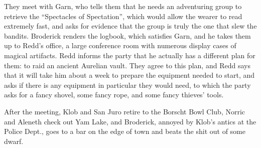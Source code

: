 They meet with Garn, who tells them that he needs an adventuring group to retrieve the ``Spectacles of Spectation'', which would allow the wearer to read extremely fast, and asks for evidence that the group is truly the one that slew the bandits. Broderick renders the logbook, which satisfies Garn, and he takes them up to Redd's office, a large conference room with numerous display cases of magical artifacts. Redd informs the party that he actually has a different plan for them: to raid an ancient Aurelian vault. They agree to this plan, and Redd says that it will take him about a week to prepare the equipment needed to start, and asks if there is any equipment in particular they would need, to which the party asks for a fancy shovel, some fancy rope, and some fancy thieves' tools.

After the meeting, Klob and San Juro retire to the Borscht Bowl Club, Norric and Aleneth check out Yam Lake, and Broderick, annoyed by Klob's antics at the Police Dept., goes to a bar on the edge of town and beats the shit out of some dwarf.

